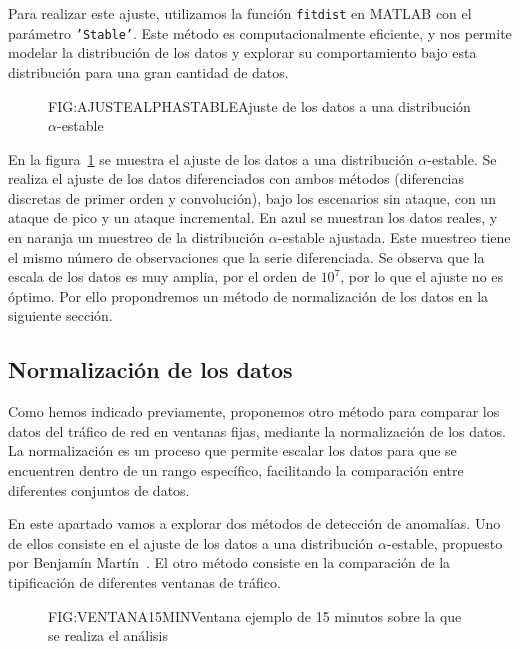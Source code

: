 Para realizar este ajuste, utilizamos la función \texttt{fitdist} en MATLAB con el parámetro \texttt{'Stable'}. Este método es computacionalmente eficiente, y nos permite modelar la distribución de los datos y explorar su comportamiento bajo esta distribución para una gran cantidad de datos.

\begin{figure}[Ajuste de los datos a una distribución $\alpha$-estable]{FIG:AJUSTEALPHASTABLE}{Ajuste de los datos a una distribución $\alpha$-estable}
    \label{FIG:AJUSTEALPHASTABLE}
\end{figure}

En la figura~\ref{FIG:AJUSTEALPHASTABLE} se muestra el ajuste de los datos a una distribución $\alpha$-estable. Se realiza el ajuste de los datos diferenciados con ambos métodos (diferencias discretas de primer orden y convolución), bajo los escenarios sin ataque, con un ataque de pico y un ataque incremental. En azul se muestran los datos reales, y en naranja un muestreo de la distribución $\alpha$-estable ajustada. Este muestreo tiene el mismo número de observaciones que la serie diferenciada.
Se observa que la escala de los datos es muy amplia, por el orden de $10^7$, por lo que el ajuste no es óptimo. Por ello propondremos un método de normalización de los datos en la siguiente sección.

\subsection{Normalización de los datos}

Como hemos indicado previamente, proponemos otro método para comparar los datos del tráfico de red en ventanas fijas, mediante la normalización de los datos. La normalización es un proceso que permite escalar los datos para que se encuentren dentro de un rango específico, facilitando la comparación entre diferentes conjuntos de datos.

En este apartado vamos a explorar dos métodos de detección de anomalías. Uno de ellos consiste en el ajuste de los datos a una distribución $\alpha$-estable, propuesto por Benjamín Martín~\cite{benjamin2021}. El otro método consiste en la comparación de la tipificación de diferentes ventanas de tráfico.

\begin{figure}[Ventana ejemplo de 15 minutos sobre la que se realiza el análisis]{FIG:VENTANA15MIN}{Ventana ejemplo de 15 minutos sobre la que se realiza el análisis}
    \label{FIG:VENTANA15MIN}
\end{figure}

